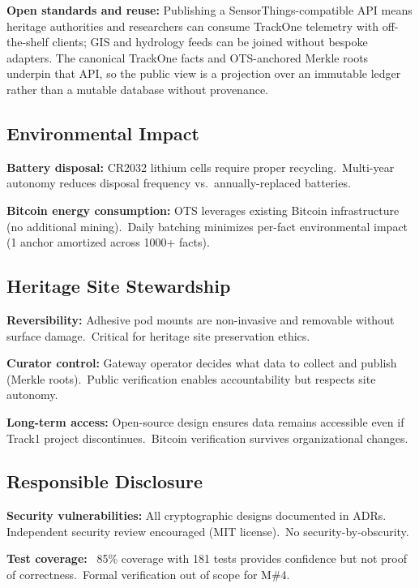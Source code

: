 \textbf{Open standards and reuse:} Publishing a SensorThings-compatible API means heritage authorities and researchers can consume TrackOne telemetry with off-the-shelf clients; GIS and hydrology feeds can be joined without bespoke adapters.
The canonical TrackOne facts and OTS-anchored Merkle roots underpin that API, so the public view is a projection over an immutable ledger rather than a mutable database without provenance.

\subsection{Environmental Impact}

\textbf{Battery disposal:} CR2032 lithium cells require proper recycling.\ Multi-year autonomy reduces disposal frequency vs.\ annually-replaced batteries.

\textbf{Bitcoin energy consumption:} OTS leverages existing Bitcoin infrastructure (no additional mining).\ Daily batching minimizes per-fact environmental impact (1 anchor amortized across 1000+ facts).

\subsection{Heritage Site Stewardship}

\textbf{Reversibility:} Adhesive pod mounts are non-invasive and removable without surface damage.\ Critical for heritage site preservation ethics.

\textbf{Curator control:} Gateway operator decides what data to collect and publish (Merkle roots).\ Public verification enables accountability but respects site autonomy.

\textbf{Long-term access:} Open-source design ensures data remains accessible even if Track1 project discontinues.\ Bitcoin verification survives organizational changes.

\subsection{Responsible Disclosure}

\textbf{Security vulnerabilities:} All cryptographic designs documented in ADRs. Independent security review encouraged (MIT license).\ No security-by-obscurity.

\textbf{Test coverage:} ~85\% coverage with 181 tests provides confidence but not proof of correctness.\ Formal verification out of scope for M\#4.

